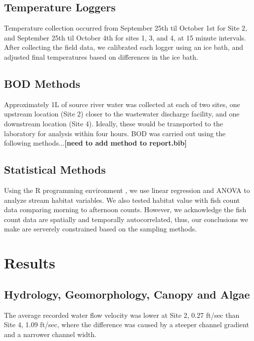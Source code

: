 \documentclass{article}\usepackage[]{graphicx}\usepackage[]{color}
\begin{document}
\subsection{Temperature Loggers}

Temperature collection occurred from September 25th til October 1st for Site 2, and September 25th til October 4th for sites 1, 3, and 4, at 15 minute intervals. After collecting the field data, we calibrated each logger using an ice bath, and adjusted final temperatures based on differences in the ice bath.

\subsection{BOD Methods}

Approximately 1L of source river water was collected at each of two sites, one upstream location (Site 2) closer to the wastewater discharge facility, and one downstream location (Site 4). Ideally, these would be transported to the laboratory for analysis within four hours. BOD was carried out using the following methods...\textbf{[need to add method to report.bib]}

\subsection{Statistical Methods}

Using the R programming environment \citep{CRAN}, we use linear regression and ANOVA to analyze stream habitat variables. We also tested habitat value with fish count data comparing morning to afternoon counts. However, we acknowledge the fish count data are spatially and temporally autocorrelated, thus, our conclusions we make are serverely constrained based on the sampling methods.

\section{Results}



\subsection{Hydrology, Geomorphology, Canopy and Algae}

The average recorded water flow velocity was lower at Site 2, 0.27 ft/sec than Site 4, 1.09 ft/sec, where the difference was caused by a steeper channel gradient and a narrower channel width. 
\end{document}
